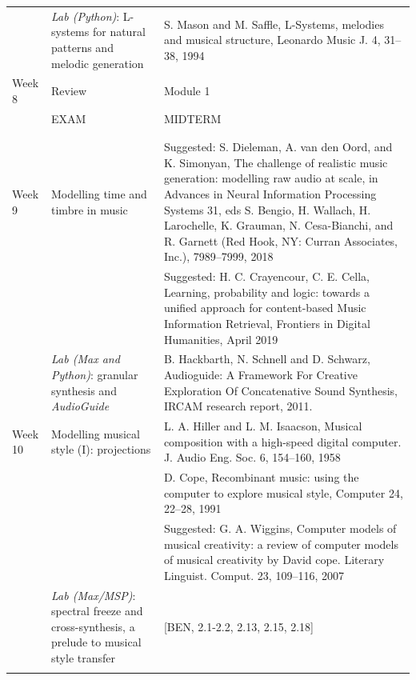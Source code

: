 \documentclass[letterpaper]{inzane_syllabus} %
\begin{document}
\begin{center}
\begin{tabularx}{\textwidth}{p{2cm}p{8cm} @{\hskip 0.5cm} p{9.5cm}}
&  \emph{Lab (Python)}: L-systems for natural patterns and melodic generation &  S. Mason and M. Saffle, L-Systems, melodies and musical structure, Leonardo Music J. 4, 31–38, 1994 \\
\arrayrulecolor{maingray}\hline

 Week 8 & Review & Module 1 \\
 &EXAM &  MIDTERM \\
& & \\ 
 \arrayrulecolor{myCOLOR}\hline
\multicolumn{2}{l}{\textbf{\textcolor{myCOLOR}{\large MODULE 2: Transformations }}} \\
\hline

Week 9 & Modelling time and timbre in music & Suggested: S. Dieleman, A.  van den Oord,  and K. Simonyan, The challenge of realistic music generation: modelling raw audio at scale, in Advances in Neural Information Processing Systems 31, eds S. Bengio, H. Wallach, H. Larochelle, K. Grauman, N. Cesa-Bianchi, and R. Garnett (Red Hook, NY: Curran Associates,
Inc.), 7989–7999, 2018 \\
& &  Suggested: H. C. Crayencour, C. E. Cella, Learning, probability and logic: towards a unified approach for content-based Music Information Retrieval, Frontiers in Digital Humanities, April 2019 \\

& \emph{Lab (Max and Python)}: granular synthesis and \emph{AudioGuide} & B. Hackbarth, N. Schnell and D. Schwarz, Audioguide: A Framework For Creative Exploration Of Concatenative Sound Synthesis, IRCAM research report, 2011. \\

\arrayrulecolor{maingray}\hline

Week 10 & Modelling musical style (I): projections & L. A. Hiller and L. M. Isaacson, Musical composition with a high-speed
digital computer. J. Audio Eng. Soc. 6, 154–160, 1958 \\
& & D. Cope, Recombinant music: using the computer to explore musical style, Computer 24, 22–28, 1991 \\
& &  Suggested: G. A. Wiggins, Computer models of musical creativity: a review of computer models of musical creativity by David cope. Literary Linguist. Comput. 23, 109–116, 2007 \\

&   \emph{Lab (Max/MSP)}: spectral freeze and cross-synthesis, a prelude to musical style transfer & [BEN, 2.1-2.2, 2.13, 2.15, 2.18] \\
\arrayrulecolor{maingray}\hline


\end{tabularx}
\end{center}
\end{document}
